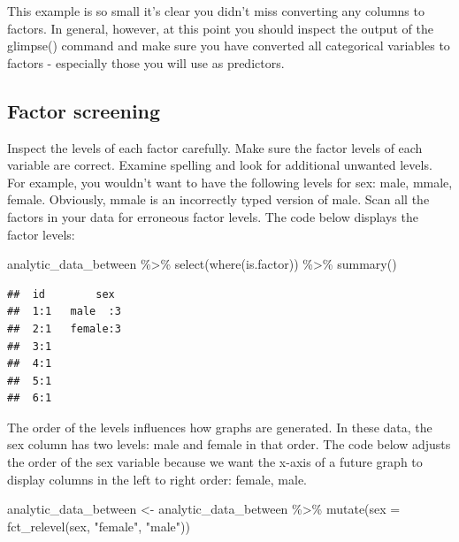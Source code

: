 \documentclass[
]{krantz}
\makeatletter
\newenvironment{Shaded}{\begin{snugshade}}{\end{snugshade}}
\newcommand{\AttributeTok}[1]{\textcolor[rgb]{0.61,0.61,0.61}{#1}}
\newcommand{\FunctionTok}[1]{\textcolor[rgb]{0,0,0}{#1}}
\newcommand{\NormalTok}[1]{#1}
\newcommand{\OtherTok}[1]{\textcolor[rgb]{0.37,0.37,0.37}{#1}}
\newcommand{\SpecialCharTok}[1]{\textcolor[rgb]{0,0,0}{#1}}
\newcommand{\StringTok}[1]{\textcolor[rgb]{0.5,0.5,0.5}{#1}}
\newenvironment{kframe}{%
\medskip{}
\setlength{\fboxsep}{.8em}
 \def\at@end@of@kframe{}%
 \ifinner\ifhmode%
  \def\at@end@of@kframe{\end{minipage}}%
  \begin{minipage}{\columnwidth}%
 \fi\fi%
 \def\FrameCommand##1{\hskip\@totalleftmargin \hskip-\fboxsep
 \colorbox{shadecolor}{##1}\hskip-\fboxsep
     \hskip-\linewidth \hskip-\@totalleftmargin \hskip\columnwidth}%
 \MakeFramed {\advance\hsize-\width
   \@totalleftmargin\z@ \linewidth\hsize
   \@setminipage}}%
 {\par\unskip\endMakeFramed%
 \at@end@of@kframe}
\renewenvironment{Shaded}{\begin{kframe}}{\end{kframe}}
\makeatother
\begin{document}
This example is so small it's clear you didn't miss converting any columns to factors. In general, however, at this point you should inspect the output of the glimpse() command and make sure you have converted all categorical variables to factors - especially those you will use as predictors.

\hypertarget{factor-screening-2}{%
\subsection{Factor screening}\label{factor-screening-2}}

Inspect the levels of each factor carefully. Make sure the factor levels of each variable are correct. Examine spelling and look for additional unwanted levels. For example, you wouldn't want to have the following levels for sex: male, mmale, female. Obviously, mmale is an incorrectly typed version of male. Scan all the factors in your data for erroneous factor levels. The code below displays the factor levels:

\begin{Shaded}
\begin{Highlighting}[]
\NormalTok{analytic\_data\_between }\SpecialCharTok{\%\textgreater{}\%}
  \FunctionTok{select}\NormalTok{(}\FunctionTok{where}\NormalTok{(is.factor)) }\SpecialCharTok{\%\textgreater{}\%}
  \FunctionTok{summary}\NormalTok{()}
\end{Highlighting}
\end{Shaded}

\begin{verbatim}
##  id        sex   
##  1:1   male  :3  
##  2:1   female:3  
##  3:1             
##  4:1             
##  5:1             
##  6:1
\end{verbatim}

The order of the levels influences how graphs are generated. In these data, the sex column has two levels: male and female in that order. The code below adjusts the order of the sex variable because we want the x-axis of a future graph to display columns in the left to right order: female, male.

\begin{Shaded}
\begin{Highlighting}[]
\NormalTok{analytic\_data\_between }\OtherTok{\textless{}{-}}\NormalTok{ analytic\_data\_between }\SpecialCharTok{\%\textgreater{}\%}
  \FunctionTok{mutate}\NormalTok{(}\AttributeTok{sex =} \FunctionTok{fct\_relevel}\NormalTok{(sex,}
                           \StringTok{"female"}\NormalTok{,}
                           \StringTok{"male"}\NormalTok{))}
\end{Highlighting}
\end{Shaded}
\end{document}
